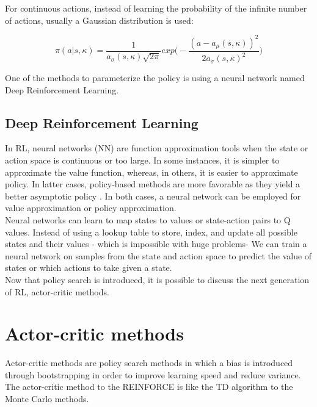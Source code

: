 For continuous actions, instead of learning the probability of the infinite number of actions, usually a Gaussian distribution is used:

\begin{equation}
	\pi(a|s,\kappa) = \frac{1}{a_\sigma(s,\kappa) \sqrt{2\pi}} exp\big( -\frac{(a-a_\mu(s,\kappa))^2}{2a_\sigma(s,\kappa)^2} \big)
\end{equation}

One of the methods to parameterize the policy is using a neural network named Deep Reinforcement Learning.

\subsection{Deep Reinforcement Learning}

In RL, neural networks (NN) are function approximation tools when the state or action space is continuous or too large. In some instances, it is simpler to approximate the value function, whereas, in others, it is easier to approximate policy. In latter cases, policy-based methods are more favorable as they yield a better asymptotic policy \cite{simsek2016most}. In both cases, a neural network can be employed for value approximation or policy approximation.\\

Neural networks can learn to map states to values or state-action pairs to Q values. Instead of using a lookup table to store, index, and update all possible states and their values - which is impossible with huge problems- We can train a neural network on samples from the state and action space to predict the value of states or which actions to take given a state.\\

Now that policy search is introduced, it is possible to discuss the next generation of RL, actor-critic methods.\\

\section{Actor-critic methods}

Actor-critic methods are policy search methods in which a bias is introduced through bootstrapping in order to improve learning speed and reduce variance. The actor-critic method to the REINFORCE is like the TD algorithm to the Monte Carlo methods. \\

